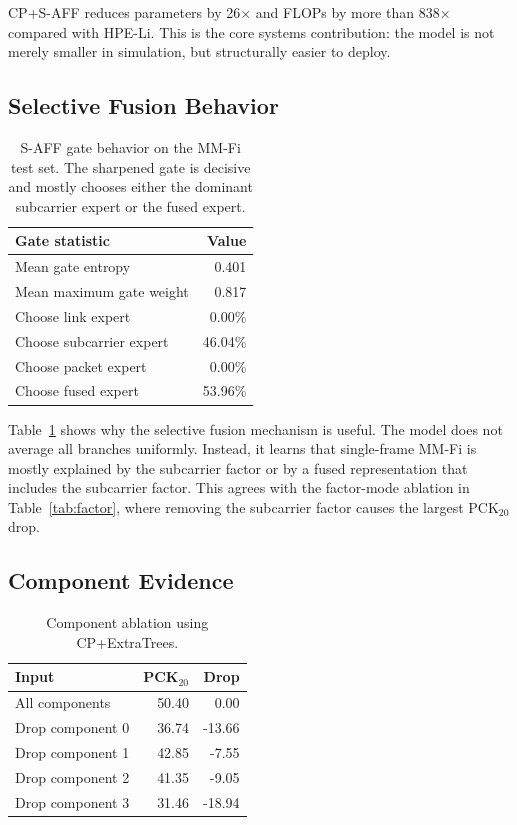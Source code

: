 \documentclass[10pt,conference]{IEEEtran}
\begin{document}
CP+S-AFF reduces parameters by 26$\times$ and FLOPs by more than 838$\times$ compared with HPE-Li. This is the core systems contribution: the model is not merely smaller in simulation, but structurally easier to deploy.

\subsection{Selective Fusion Behavior}

\begin{table}[t]
\centering
\caption{S-AFF gate behavior on the MM-Fi test set. The sharpened gate is decisive and mostly chooses either the dominant subcarrier expert or the fused expert.}
\label{tab:gate}
\begin{tabular}{lr}
\toprule
Gate statistic & Value \\
\midrule
Mean gate entropy & 0.401 \\
Mean maximum gate weight & 0.817 \\
Choose link expert & 0.00\% \\
Choose subcarrier expert & 46.04\% \\
Choose packet expert & 0.00\% \\
Choose fused expert & 53.96\% \\
\bottomrule
\end{tabular}
\end{table}

Table~\ref{tab:gate} shows why the selective fusion mechanism is useful. The model does not average all branches uniformly. Instead, it learns that single-frame MM-Fi is mostly explained by the subcarrier factor or by a fused representation that includes the subcarrier factor. This agrees with the factor-mode ablation in Table~\ref{tab:factor}, where removing the subcarrier factor causes the largest PCK$_{20}$ drop.

\subsection{Component Evidence}

\begin{table}[t]
\centering
\caption{Component ablation using CP+ExtraTrees.}
\label{tab:component}
\begin{tabular}{lrr}
\toprule
Input & PCK$_{20}$ & Drop \\
\midrule
All components & 50.40 & 0.00 \\
Drop component 0 & 36.74 & -13.66 \\
Drop component 1 & 42.85 & -7.55 \\
Drop component 2 & 41.35 & -9.05 \\
Drop component 3 & 31.46 & -18.94 \\
\bottomrule
\end{tabular}
\end{table}
\end{document}
